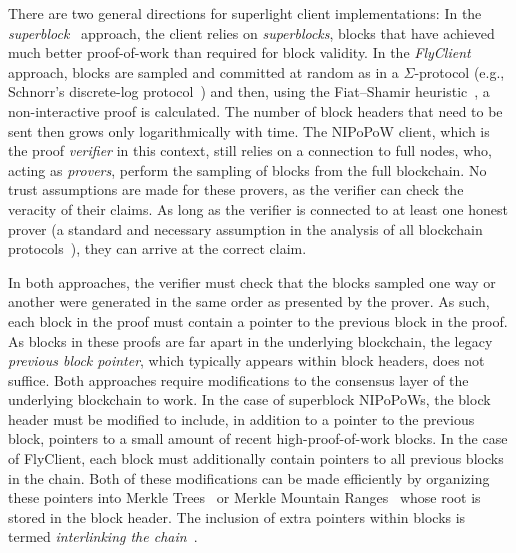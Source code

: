 There are two general directions for superlight client implementations: In the
\emph{superblock}~\cite{nipopows,compactsuperblocks} approach, the client
relies on \emph{superblocks}, blocks that have achieved much better
proof-of-work than required for block validity. In the
\emph{FlyClient}~\cite{flyclient} approach, blocks are sampled and committed at random as in a $\Sigma$-protocol (e.g., Schnorr's discrete-log protocol~\cite{schnorr}) and then, using
the Fiat--Shamir heuristic~\cite{fiatshamir}, a non-interactive proof is calculated. The number of block headers
that need to be sent then grows only logarithmically with time. The NIPoPoW
client, which is the proof \emph{verifier} in this context, still relies on a connection to full nodes,
who, acting as \emph{provers},  perform the sampling of blocks from the full
blockchain.
No trust assumptions are made for these provers, as the
verifier can check the veracity of their claims. As long as the verifier is
connected to at least one honest prover
(a standard and necessary assumption in the analysis of all blockchain
protocols~\cite{eclipse,ethereum-eclipse,backbone,backbone-new,varbackbone}),
they can arrive at the correct claim.

In both approaches, the verifier must check that the blocks
sampled one way or another were generated in the same order as presented by the prover. As such, each block in the proof must contain a
pointer to the previous block in the proof. As blocks in these proofs are far
apart in the underlying blockchain, the legacy \emph{previous block pointer},
which typically appears within block headers, does not suffice.
Both approaches require modifications to the consensus layer of the underlying
blockchain to work. In the case of superblock NIPoPoWs, the block header must be
modified to include, in addition to a pointer to the previous block, pointers to
a small amount of recent high-proof-of-work blocks. In the case of FlyClient,
each block must additionally contain pointers to all previous blocks in the
chain. Both of these modifications can be made efficiently by organizing these
pointers into Merkle Trees~\cite{merkle} or Merkle Mountain Ranges~\cite{ct,mmr}
whose root is stored in the block header. The inclusion of extra pointers within
blocks is termed \emph{interlinking the chain}~\cite{popow}.

